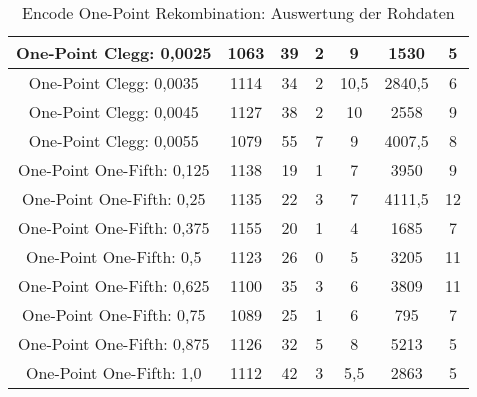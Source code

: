 \begin{table}[H]
\begin{tabular}{c | c | c | c | c | c | c}
		\hline
		One-Point Clegg: 0,0025 & 1063 & 39 & 2 & 9 & 1530 & 5\\
		\hline
		One-Point Clegg: 0,0035 & 1114 & 34 & 2 & 10,5 & 2840,5 & 6\\
		\hline
		One-Point Clegg: 0,0045 & 1127 & 38 & 2 & 10 & 2558 & 9\\
		\hline
		One-Point Clegg: 0,0055 & 1079 & 55 & 7 & 9 & 4007,5 & 8\\
		\hline
		\hline
		One-Point One-Fifth: 0,125 & 1138 & 19 & 1 & 7 & 3950 & 9\\
		\hline
		One-Point One-Fifth: 0,25 & 1135 & 22 & 3 & 7 & 4111,5 & 12\\
		\hline
		One-Point One-Fifth: 0,375 & 1155 & 20 & 1 & 4 & 1685 & 7\\
		\hline
		One-Point One-Fifth: 0,5 & 1123 & 26 & 0 & 5 & 3205 & 11\\
		\hline
		One-Point One-Fifth: 0,625 & 1100 & 35 & 3 & 6 & 3809 & 11\\
		\hline
		One-Point One-Fifth: 0,75 & 1089 & 25 & 1 & 6 & 795 & 7\\
		\hline
		One-Point One-Fifth: 0,875 & 1126 & 32 & 5 & 8 & 5213 & 5\\
		\hline
		One-Point One-Fifth: 1,0 & 1112 & 42 & 3 & 5,5 & 2863 & 5\\
	\end{tabular}
	\caption{Encode One-Point Rekombination: Auswertung der Rohdaten}
	\label{table:encodeOnePointRohdaten}
\end{table}
